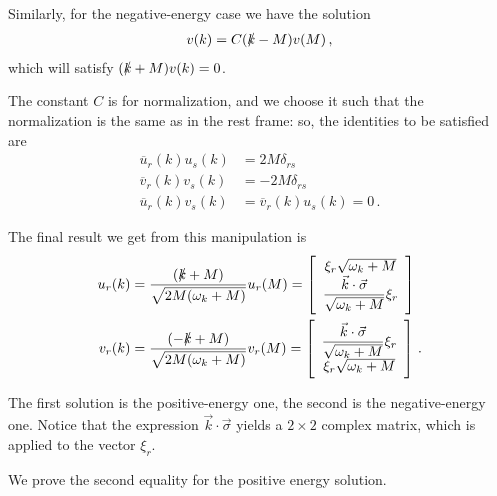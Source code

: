 \documentclass[main.tex]{subfiles}
\begin{document}
Similarly, for the negative-energy case we have the solution 
%
\begin{align}
v(k) = C (\slashed{k} - M )v(M)
\,,
\end{align}
%
which will satisfy \((\slashed{k} + M) v(k) = 0\).

The constant \(C\) is for normalization, and we choose it such that the normalization is the same as in the rest frame: so, the identities to be satisfied are 
%
\begin{align} \label{eq:normalization-spinor}
\overline{u}_{r} (k) u_{s}(k) &= 2 M \delta_{rs}  \\
\overline{v}_{r} (k) v_{s}(k) &= - 2 M \delta_{rs}  \\
\overline{u}_{r} (k) v_{s}(k) &=   
\overline{v}_{r} (k) u_{s}(k) = 0  
\,.
\end{align}

\begin{claim}
The final result we get from this manipulation is 
%
\begin{align}
u_r (k) &= \frac{(\slashed{k} + M)}{\sqrt{2 M \qty(\omega_{k} + M )}} u_r (M)
= \left[\begin{array}{c}
\xi_{r}\sqrt{\omega_{k} + M} \\ 
\displaystyle
\frac{\vec{k} \cdot \vec{\sigma}}{\sqrt{\omega_{k} + M}} 
\xi_{r}
\end{array}\right] \label{eq:positive-energy-dirac-solution-momentum-space}\\
v_r (k) &= \frac{(-\slashed{k} + M)}{\sqrt{2 M \qty(\omega_{k} + M )}} v_r (M)
= \left[\begin{array}{c}
\displaystyle
\frac{\vec{k} \cdot \vec{\sigma}}{\sqrt{\omega_{k} + M}} \xi_{r}\\
\xi_{r}\sqrt{\omega_{k} + M} 
\end{array}\right]
\,.
\end{align}
\end{claim}

The first solution is the positive-energy one, the second is the negative-energy one. 
Notice that the expression \(\vec{k} \cdot \vec{\sigma}\) yields a \(2 \times 2\) complex matrix, which is applied to the vector \(\xi_{r}\).

We prove the second equality for the positive energy solution. 
\end{document}

